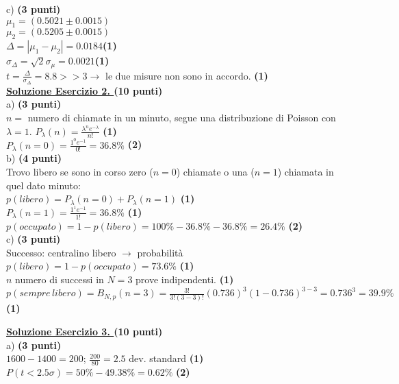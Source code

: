 \documentclass[10pt,a4paper,fleqn]{article}
\begin{document}
c) {\bf (3 punti)} \\ 
$\mu_1=(0.5021 \pm 0.0015)$\\
$\mu_2=(0.5205 \pm 0.0015)$\\
$\Delta=|\mu_1-\mu_2|=0.0184${\bf (1)}\\
$\sigma_{\Delta}=\sqrt{2}\sigma_{\mu}=0.0021${\bf (1)}\\
$t=\frac{\Delta}{\sigma_{\Delta}}=8.8 >> 3 \rightarrow $ le due misure
non sono in accordo. {\bf (1)}\\


\vskip0.30cm {\bf \underline {Soluzione Esercizio 2. } } {\bf (10 punti)}\\


a) {\bf (3 punti)}\\
$n=$ numero di chiamate in un minuto, segue una distribuzione di
Poisson con
$\lambda=1$. $P_{\lambda}(n)=\frac{\lambda^ne^{-\lambda}}{n!}$ {\bf (1)}\\
$P_{\lambda}(n=0)=\frac{1^0e^{-1}}{0!}=36.8\%$ {\bf (2)}\\
b) {\bf (4 punti)} \\
Trovo libero se sono in corso zero ($n=0$) chiamate o una ($n=1$)
chiamata in quel dato minuto:\\
$p(libero)=P_{\lambda}(n=0)+P_{\lambda}(n=1)$ {\bf (1)} \\
$P_{\lambda}(n=1)=\frac{1^1e^{-1}}{1!}=36.8\%$ {\bf (1)}\\
$p(occupato)=1-p(libero)=100\%-36.8\%-36.8\%=26.4\%$ {\bf (2)}\\
c) {\bf (3 punti)} \\
Successo: centralino libero $\rightarrow$ probabilit\`a $p(libero)=1-p(occupato)=73.6\%$ {\bf (1)}\\
$n$ numero di successi in $N=3$ prove indipendenti. {\bf (1)}\\
$p(sempre \, libero)=B_{N,p}(n=3)=\frac{3!}{3!(3-3)!}(0.736)^3(1-0.736)^{3-3}=0.736^3=39.9\%${\bf (1)}

\vskip0.30cm {\bf \underline {Soluzione Esercizio 3. } } {\bf (10 punti)}
\\
a) {\bf (3 punti)} \\
$1600-1400=200$; $\frac{200}{80}=2.5$ dev. standard {\bf (1)} \\
$P(t<2.5\sigma)=50\%-49.38\%=0.62\%$ {\bf (2)}\\
\end{document}
